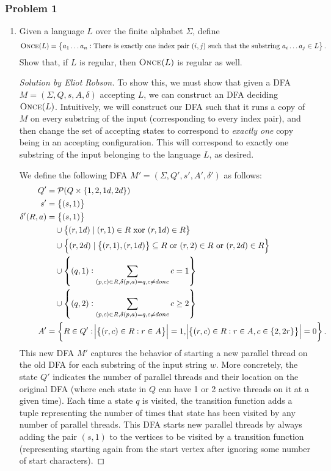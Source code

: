 \documentclass{article}
\newenvironment{solution}[1]{\begin{proof}[Solution by #1]}{\end{proof}}
\begin{document}
\subsubsection{Problem 1}
\begin{enumerate}
    \item Given a language \(L\) over the finite alphabet \(\Sigma\), define
    \[
        \textsc{Once}(L)
        =%
        \set{a_1 \dots a_n  : \text{There is exactly one index pair \((i,j)\) such that the substring \(a_i \dots a_j \in L\)}}.
    \]
    Show that, if \(L\) is regular, then \(\textsc{Once}(L)\) is regular as well.
    
    \begin{solution}{Eliot Robson}
        To show this, we must show that given a DFA \(M = (\Sigma, Q, s, A, \delta)\) accepting \(L\), we can construct an DFA deciding \(\textsc{Once}(L)\). Intuitively, we will construct our DFA such that it runs a copy of \(M\) on every substring of the input (corresponding to every index pair), and then change the set of accepting states to correspond to \textit{exactly one} copy being in an accepting configuration. This will correspond to exactly one substring of the input belonging to the language \(L\), as desired.
        
        We define the following DFA \(M' = (\Sigma, Q', s', A', \delta')\) as follows:
        \begin{align*}
            Q' &= \mathcal{P}(Q \times \set{1, 2, 1d, 2d})\\
            s' &= \set{(s, 1)}\\
            \delta'(R, a) &= \set{(s,1)}\\
                &\quad \cup \set{(r, 1d) \mid (r, 1) \in R \text{ xor } (r, 1d) \in R}\\
                &\quad \cup \set{(r, 2d) \mid \set{(r,1), (r,1d)} \subseteq R \text{ or } (r, 2) \in R \text{ or } (r, 2d) \in R}\\
                &\quad \cup \set{(q, 1) : \sum_{(p, c) \in R, \delta(p, a) = q, c \neq done} c = 1}\\
                &\quad \cup \set{(q, 2) : \sum_{(p, c) \in R, \delta(p, a) = q, c \neq done} c \geq 2}\\
            A' &= \set{R \in Q' : \abs{\set{(r, c) \in R : r \in A}} = 1,  \abs{\set{(r, c) \in R : r \in A, c \in \set{2, 2r}}} = 0}.
        \end{align*}
        This new DFA \(M'\) captures the behavior of starting a new parallel thread on the old DFA for each substring of the input string \(w\). More concretely, the state \(Q'\) indicates the number of parallel threads and their location on the original DFA (where each state in \(Q\) can have 1 or 2 active threads on it at a given time). Each time a state \(q\) is visited, the transition function adds a tuple representing the number of times that state has been visited by any number of parallel threads. This DFA starts new parallel threads by always adding the pair \((s,1)\) to the vertices to be visited by a transition function (representing starting again from the start vertex after ignoring some number of start characters).
        

\end{solution}
\end{enumerate}
\end{document}
